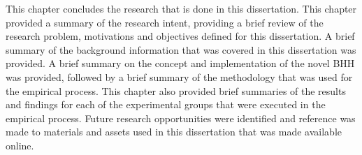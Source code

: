 This chapter concludes the research that is done in this dissertation. This chapter provided a summary of the research intent, providing a brief review of the research problem, motivations and objectives defined for this dissertation. A brief summary of the background information that was covered in this dissertation was provided. A brief summary on the concept and implementation of the novel \acs{BHH} was provided, followed by a brief summary of the methodology that was used for the empirical process. This chapter also provided brief summaries of the results and findings for each of the experimental groups that were executed in the empirical process. Future research opportunities were identified and reference was made to materials and assets used in this dissertation that was made available online.
